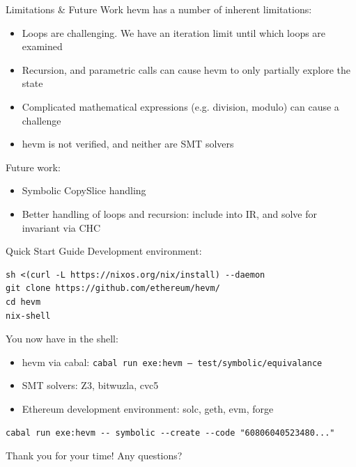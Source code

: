 \documentclass[aspectratio=169]{beamer}
\begin{document}

\begin{frame}[fragile=singleslide]{Limitations \& Future Work}
hevm has a number of inherent limitations:

\begin{itemize}
\item Loops are challenging. We have an iteration limit until which loops are examined
\item Recursion, and parametric calls can cause hevm to only partially explore the state
\item Complicated mathematical expressions (e.g. division, modulo) can cause a challenge
\item hevm is not verified, and neither are SMT solvers
\end{itemize}
\vspace{2ex}

Future work:
\begin{itemize}
\item Symbolic CopySlice handling
\item Better handling of loops and recursion: include into IR, and solve for invariant via CHC
\end{itemize}
\end{frame}

\begin{frame}[fragile=singleslide]{Quick Start Guide}
Development environment:
\begin{Verbatim}[frame=single, framerule=0.2mm, framesep=2mm,fontsize=\footnotesize]
sh <(curl -L https://nixos.org/nix/install) --daemon
git clone https://github.com/ethereum/hevm/
cd hevm
nix-shell
\end{Verbatim}

You now have in the shell:
\begin{itemize}
    \item hevm via cabal: \texttt{cabal run exe:hevm -- test/symbolic/equivalance}
    \item SMT solvers: Z3, bitwuzla, cvc5
    \item Ethereum development environment: solc, geth, evm, forge
\end{itemize}
\bigskip

\begin{Verbatim}[frame=single, framerule=0.2mm, framesep=2mm,fontsize=\footnotesize]
cabal run exe:hevm -- symbolic --create --code "60806040523480..."
\end{Verbatim}
\end{frame}

\begin{frame}{Thank you for your time!}
    Any questions?
\end{frame}
\end{document}
